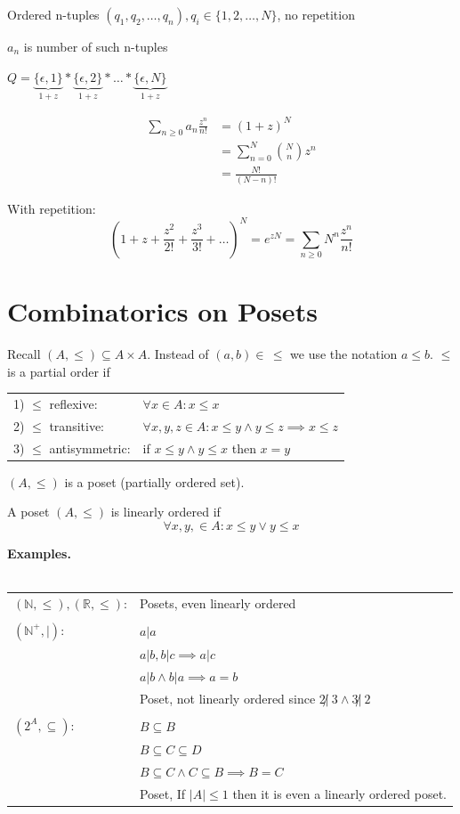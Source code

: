 Ordered n-tuples $(q_1,q_2, \ldots, q_n), q_i \in \{1,2, \ldots, N\}$, no repetition

$a_n$ is number of such n-tuples

$Q = \underbrace{\{\epsilon,1\}}_{1+z} *
     \underbrace{\{\epsilon,2\}}_{1+z} * \ldots *
     \underbrace{\{\epsilon,N\}}_{1+z} $

\begin{align*}
  \sum_{n\geq 0} a_n \frac{z^n}{n!} &=
    (1+z)^N \\
    &= \sum_{n=0} ^{N} {N \choose n} z^n \\
    &= \frac{N!}{(N-n)!}
\end{align*}

With repetition:
\[
  (1+z+ \frac{z^2}{2!} + \frac{z^3}{3!} + \ldots)^N
    = e^{zN} = \sum_{n\geq 0} N^n \frac{z^n}{n!}
\]

\section{Combinatorics on Posets}

Recall $(A, \leq) \subseteq A \times A$.
Instead of $(a,b) \in \, \leq$ we use the notation $a \leq b$. $\leq$ is a partial order if

\begin{tabular}{ll}
  1) $\leq$ reflexive: &
    $\forall x \in A: x \leq x$ \\
  2) $\leq$ transitive:  &
    $\forall x,y,z \in A: x \leq y \land y \leq z \implies x \leq z$ \\
  3) $\leq$ antisymmetric: &
    if $x \leq y \land y \leq x$ then $x = y$ \\
\end{tabular}

$(A,\leq)$ is a poset (partially ordered set).

A poset $(A,\leq)$ is linearly ordered if
\[
  \forall x,y, \in A: x \leq y \lor y \leq x
\]

\textbf{Examples.}\\\\
\begin{tabular}{l l}
  $(\mathbb{N}, \leq), (\mathbb{R}, \leq)$: & Posets, even linearly ordered \\\\

  $(\mathbb{N}^{+}, |)$:
    & $a|a$ \\
    & $ a|b, b|c \implies a|c$\\
    & $ a|b \land b|a \implies a = b$\\
    & Poset, not linearly ordered since $2 \not|~ 3 \land 3 \not|~ 2$\\\\

  $(2^A, \subseteq)$:
    & $ B \subseteq B$\\
    & $ B \subseteq C \subseteq D$\\
    & $ B \subseteq C \land C \subseteq B \implies B = C$ \\
    & Poset, If $|A|\leq 1$ then it is even a linearly ordered poset.
\end{tabular}

